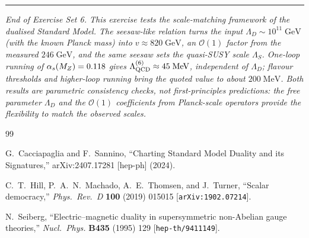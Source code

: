 \documentclass[11pt,a4paper]{article}
\begin{document}
\bigskip

\begin{center}
\rule{0.6\textwidth}{0.4pt}

\textit{End of Exercise Set 6.  This exercise tests the
scale-matching framework of the dualised Standard Model.  The
seesaw-like relation turns the input $\Lambda_D \sim 10^{11}\;\text{GeV}$
(with the known Planck mass) into $v \approx 820\;\text{GeV}$, an
$\mathcal{O}(1)$ factor from the measured $246\;\text{GeV}$, and the
same seesaw sets the quasi-SUSY scale $\Lambda_S$.  One-loop running of
$\alpha_s(M_Z) = 0.118$ gives $\Lambda_{\mathrm{QCD}}^{(6)} \approx 45\;\text{MeV}$,
independent of $\Lambda_D$; flavour thresholds and higher-loop running
bring the quoted value to about $200\;\text{MeV}$.  Both results are
parametric consistency checks, not first-principles predictions: the
free parameter $\Lambda_D$ and the $\mathcal{O}(1)$ coefficients from
Planck-scale operators provide the flexibility to match the observed
scales.}
\end{center}


\begin{thebibliography}{99}

  G.~Cacciapaglia and F.~Sannino,
  ``Charting Standard Model Duality and its Signatures,''
  arXiv:2407.17281 [hep-ph] (2024).

  C.~T.~Hill, P.~A.~N.~Machado, A.~E.~Thomsen, and J.~Turner,
  ``Scalar democracy,''
  \textit{Phys.\ Rev.\ D} \textbf{100} (2019) 015015
  [\texttt{arXiv:1902.07214}].

  N.~Seiberg,
  ``Electric--magnetic duality in supersymmetric non-Abelian gauge
  theories,''
  \textit{Nucl.\ Phys.} \textbf{B435} (1995) 129
  [\texttt{hep-th/9411149}].

\end{thebibliography}
\end{document}

